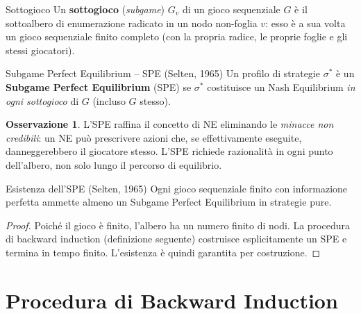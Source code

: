 \documentclass[12pt,a4paper,twoside]{book}
\theoremstyle{plain}
\theoremstyle{definition}
\newtheorem{remark}[theorem]{Osservazione}
\begin{document}
\begin{defbox}{Sottogioco}
Un \textbf{sottogioco} (\emph{subgame}) $G_v$ di un gioco sequenziale $G$ è il sottoalbero di enumerazione radicato in un nodo non-foglia $v$: esso è a sua volta un gioco sequenziale finito completo (con la propria radice, le proprie foglie e gli stessi giocatori).
\end{defbox}

\begin{defbox}{Subgame Perfect Equilibrium -- SPE (Selten, 1965)}
Un profilo di strategie $\sigma^*$ è un \textbf{Subgame Perfect Equilibrium} (SPE) se $\sigma^*$ costituisce un Nash Equilibrium \emph{in ogni sottogioco} di $G$ (incluso $G$ stesso).
\end{defbox}

\begin{remark}
L'SPE raffina il concetto di NE eliminando le \emph{minacce non credibili}: un NE può prescrivere azioni che, se effettivamente eseguite, danneggerebbero il giocatore stesso. L'SPE richiede razionalità in ogni punto dell'albero, non solo lungo il percorso di equilibrio.
\end{remark}

\begin{thmbox}{Esistenza dell'SPE (Selten, 1965)}
\label{thm:spe-existence}
Ogni gioco sequenziale finito con informazione perfetta ammette almeno un Subgame Perfect Equilibrium in strategie pure.
\end{thmbox}

\begin{proof}
Poiché il gioco è finito, l'albero ha un numero finito di nodi. La procedura di backward induction (definizione seguente) costruisce esplicitamente un SPE e termina in tempo finito. L'esistenza è quindi garantita per costruzione.
\end{proof}

\section{Procedura di Backward Induction}
\end{document}
